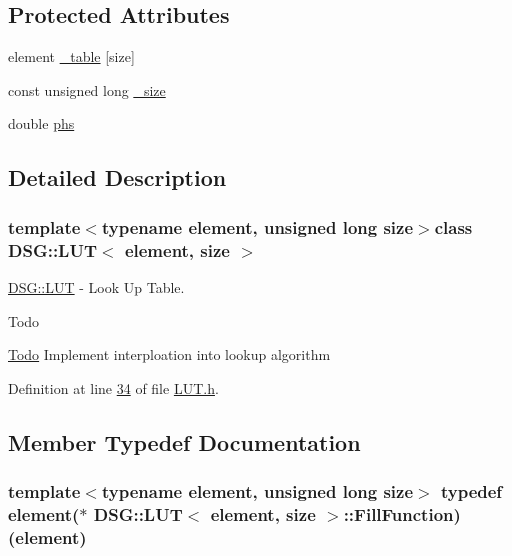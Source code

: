 \subsection*{Protected Attributes}
\begin{DoxyCompactItemize}
\item 
element \hyperlink{class_d_s_g_1_1_l_u_t_ac8b23bbb7ce259d4ceb1c6fa93a7f29f}{\+\_\+table} \mbox{[}size\mbox{]}
\item 
const unsigned long \hyperlink{class_d_s_g_1_1_l_u_t_a87c352b5eaea2188955213c0f4ae9799}{\+\_\+size}
\item 
double \hyperlink{class_d_s_g_1_1_l_u_t_a9ab8f8e89346c759e06f6d76c5b816cc}{phs}
\end{DoxyCompactItemize}


\subsection{Detailed Description}
\subsubsection*{template$<$typename element, unsigned long size$>$class D\+S\+G\+::\+L\+U\+T$<$ element, size $>$}

\hyperlink{class_d_s_g_1_1_l_u_t}{D\+S\+G\+::\+L\+U\+T} -\/ Look Up Table. 

\begin{DoxyRefDesc}{Todo}
\item[\hyperlink{todo__todo000008}{Todo}]Implement interploation into lookup algorithm \end{DoxyRefDesc}


Definition at line \hyperlink{_l_u_t_8h_source_l00034}{34} of file \hyperlink{_l_u_t_8h_source}{L\+U\+T.\+h}.



\subsection{Member Typedef Documentation}
\hypertarget{class_d_s_g_1_1_l_u_t_af2436acdd3f277cc4cac77c3c07cb4ca}{
\subsubsection[{Fill\+Function}]{\setlength{\rightskip}{0pt plus 5cm}template$<$typename element, unsigned long size$>$ typedef element($\ast$ {\bf D\+S\+G\+::\+L\+U\+T}$<$ element, size $>$\+::Fill\+Function)(element)}}\label{class_d_s_g_1_1_l_u_t_af2436acdd3f277cc4cac77c3c07cb4ca}


